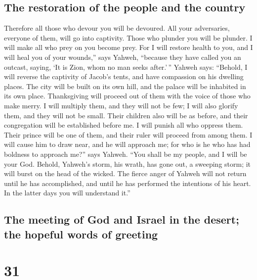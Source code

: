 \hypertarget{the-restoration-of-the-people-and-the-country}{%
\subsection{The restoration of the people and the
country}\label{the-restoration-of-the-people-and-the-country}}

 Therefore all those who devour you will be devoured. All
your adversaries, everyone of them, will go into captivity. Those who
plunder you will be plunder. I will make all who prey on you become
prey.  For I will restore health to you, and I will heal
you of your wounds,'' says Yahweh, ``because they have called you an
outcast, saying, `It is Zion, whom no man seeks after.'\,''
 Yahweh says: ``Behold, I will reverse the captivity of
Jacob's tents, and have compassion on his dwelling places. The city will
be built on its own hill, and the palace will be inhabited in its own
place.  Thanksgiving will proceed out of them with the
voice of those who make merry. I will multiply them, and they will not
be few; I will also glorify them, and they will not be small.
 Their children also will be as before, and their
congregation will be established before me. I will punish all who
oppress them.  Their prince will be one of them, and
their ruler will proceed from among them. I will cause him to draw near,
and he will approach me; for who is he who has had boldness to approach
me?'' says Yahweh.  ``You shall be my people, and I will
be your God.  Behold, Yahweh's storm, his wrath, has gone
out, a sweeping storm; it will burst on the head of the wicked.
 The fierce anger of Yahweh will not return until he has
accomplished, and until he has performed the intentions of his heart. In
the latter days you will understand it.''

\hypertarget{the-meeting-of-god-and-israel-in-the-desert-the-hopeful-words-of-greeting}{%
\subsection{The meeting of God and Israel in the desert; the hopeful
words of
greeting}\label{the-meeting-of-god-and-israel-in-the-desert-the-hopeful-words-of-greeting}}

\hypertarget{section-30}{%
\section{31}\label{section-30}}


